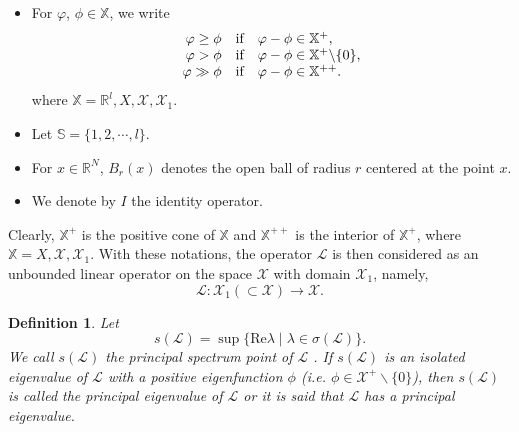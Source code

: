 \documentclass[11pt,reqno]{amsart}
\newtheorem{definition}[theorem]{Definition}
\numberwithin{equation}{section}
\begin{document}
\begin{itemize}[leftmargin= 0.8cm]
\item For $\varphi$, $\phi \in \mathbb{X}$, we write
$$
\begin{array}{r c l}
\varphi \geq \phi & \text{if} & \varphi - \phi \in
\mathbb{X}^{+},
\\
\varphi > \phi & \text{if} & \varphi - \phi \in \mathbb{X}^{+} \backslash \{ 0 \},
\\
\varphi \gg \phi & \text{if} & \varphi - \phi \in \mathbb{X}^{++} .
\end{array}
$$
where $\mathbb{X} = \mathbb{R}^{l},X,\mathcal{X},\mathcal{X}_{1}$.


\item Let $\mathbb{S}=\{1,2,\cdots,l\}$.


\item For $x\in\mathbb{R}^{N}$, $B_{r}(x)$ denotes the open ball of radius $r$ centered at the point $x$.

\item We denote by $I$ the identity operator.


\end{itemize}

Clearly, $ \mathbb{X}^{+} $ is the positive cone of $\mathbb{X}$ and $\mathbb{X}^{++}$ is the interior of $\mathbb{X}^{+}$, where $\mathbb{X}=X,\mathcal{X},\mathcal{X}_{1}$.
With these notations, the operator $\mathcal{L}$ is then considered as an unbounded linear operator on the space $\mathcal{X}$ with domain $\mathcal{X}_{1}$, namely,
\begin{equation*}
\mathcal{L} : \mathcal{X}_{1}\left( \subset \mathcal{X} \right) \to \mathcal{X}.
\end{equation*}

\begin{definition}{\rm
Let
\begin{equation*}
s(\mathcal{L}) = \sup\{\text{Re} \lambda \mid \lambda \in \sigma(\mathcal{L})\}.
\end{equation*}
We call $s(\mathcal{L})$ the principal spectrum point of  $\mathcal{L}$ .
If  $s(\mathcal{L})$  is an isolated eigenvalue of  $\mathcal{L}$  with a positive eigenfunction  $\phi$  (i.e.  $\phi \in \mathcal{X}^+ \backslash \{ 0 \}$), then  $s(\mathcal{L})$  is called the principal eigenvalue of $ \mathcal{L} $  or it is said that  $\mathcal{L}$  has a principal eigenvalue.
}
\end{definition}
\end{document}
